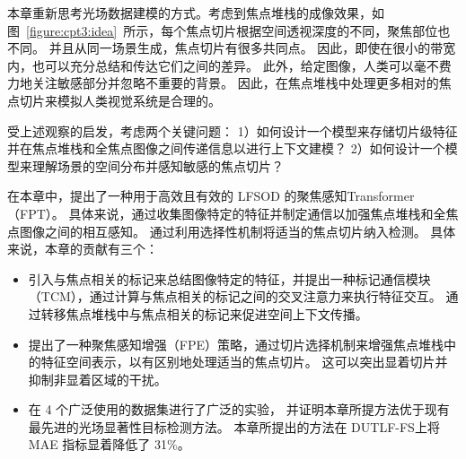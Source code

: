 本章重新思考光场数据建模的方式。考虑到焦点堆栈的成像效果，如图~\ref{figure:cpt3:idea}~所示，每个焦点切片根据空间透视深度的不同，聚焦部位也不同。 并且从同一场景生成，焦点切片有很多共同点。
因此，即使在很小的带宽内，也可以充分总结和传达它们之间的差异。 此外，给定图像，人类可以毫不费力地关注敏感部分并忽略不重要的背景。 因此，在焦点堆栈中处理更多相对的焦点切片来模拟人类视觉系统是合理的。 


受上述观察的启发，考虑两个关键问题：
1）如何设计一个模型来存储切片级特征并在焦点堆栈和全焦点图像之间传递信息以进行上下文建模？ 
2）如何设计一个模型来理解场景的空间分布并感知敏感的焦点切片？ 

在本章中，提出了一种用于高效且有效的 LFSOD 的聚焦感知Transformer（FPT）。 
具体来说，通过收集图像特定的特征并制定通信以加强焦点堆栈和全焦点图像之间的相互感知。 
通过利用选择性机制将适当的焦点切片纳入检测。 
具体来说，本章的贡献有三个：



\begin{itemize}
	\item 引入与焦点相关的标记来总结图像特定的特征，并提出一种标记通信模块（TCM），通过计算与焦点相关的标记之间的交叉注意力来执行特征交互。 通过转移焦点堆栈中与焦点相关的标记来促进空间上下文传播。 
	
	\item 提出了一种聚焦感知增强（FPE）策略，通过切片选择机制来增强焦点堆栈中的特征空间表示，以有区别地处理适当的焦点切片。	这可以突出显着切片并抑制非显着区域的干扰。 
	
	\item 在 4 个广泛使用的数据集进行了广泛的实验，
	并证明本章所提方法优于现有最先进的光场显著性目标检测方法。 本章所提出的方法在 DUTLF-FS上将 MAE 指标显着降低了 31\%。
\end{itemize}









